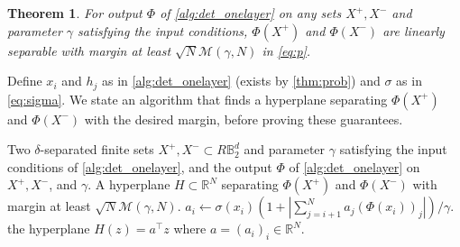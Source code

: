 \documentclass[aoap]{imsart}
\numberwithin{equation}{section}
\newtheorem{theorem}{Theorem}[section]
\theoremstyle{definition}
\theoremstyle{remark}
\newcommand{\R}{\mathbb{R}} %
\numberwithin{equation}{section}
\newcommand{\0}{\mathbf{0}}
\newcommand{\1}{\mathbf{1}}
\newcommand{\B}{\mathbb{B}}
\numberwithin{equation}{section}
\begin{document}
\begin{theorem}\label{thm:fin}
For output $\Phi$ of \cref{alg:det_onelayer} on any sets $X^{+}, X^{-}$ and parameter $\gamma$ satisfying the input conditions, $\Phi (X^{+})$ and $\Phi (X^{-})$ are linearly separable with margin at least $\sqrt{N}\mathcal{M}(\gamma, N)$ in \eqref{eq:p}.
\end{theorem}

Define $x_i$ and $h_j$ as in \cref{alg:det_onelayer} (exists by \cref{thm:prob}) and $\sigma$ as in \eqref{eq:sigma}. We state an algorithm that finds a hyperplane separating $\Phi(X^+)$ and $\Phi(X^-)$ with the desired margin, before proving these guarantees.
\begin{algorithm}[H]
\caption{Separate the image of the sets under the output of \cref{alg:det_onelayer}}
\label{alg:weights}
\begin{algorithmic}[1]
\Require Two $\delta$-separated finite sets $X^{+}, X^{-}\subset R\B_2^d$ and parameter $\gamma$ satisfying the input conditions of \cref{alg:det_onelayer}, and the output $\Phi$ of \cref{alg:det_onelayer} on $X^{+}, X^{-}$, and $\gamma$.
\Ensure A hyperplane $H\subset \R^N$ separating $\Phi(X^+)$ and $\Phi(X^-)$ with margin at least $\sqrt{N}\mathcal{M}(\gamma, N)$.
    \State $a_i\gets\sigma(x_i)\left(1+\left\vert\sum_{j=i+1}^Na_j(\Phi(x_i))_j\right\vert\right)/\gamma$.
\EndFor
\State \Return the hyperplane $H(z)=a^{\intercal}z$ where $a=(a_i)_i\in\R^N$.
\end{algorithmic}
\end{algorithm}
\end{document}
